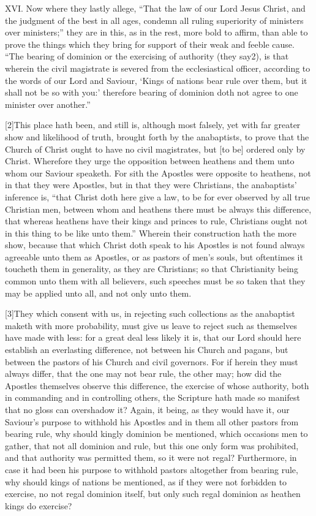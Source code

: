 XVI. Now where they lastly allege, “That the law of our Lord Jesus Christ, and the judgment of the best in all ages, condemn all ruling superiority of ministers over ministers;” they are in this, as in the rest, more bold to affirm, than able to prove the things which they bring for support of their weak and feeble cause. “The bearing of dominion or the exercising of authority (they say2), is that wherein the civil magistrate is severed from the ecclesiastical officer, according to the words of our Lord and Saviour, ‘Kings of nations bear rule over them, but it shall not be so with you:’ therefore bearing of dominion doth not agree to one minister over another.”

[2]This place hath been, and still is, although most falsely, yet with far greater show and likelihood of truth, brought forth by the anabaptists, to prove that the Church of Christ ought to have no civil magistrates, but [to be] ordered only by Christ. Wherefore they urge the opposition between heathens and them unto whom our Saviour speaketh. For sith the Apostles were opposite to heathens, not in that they were Apostles, but in that they were Christians, the  anabaptists’ inference is, “that Christ doth here give a law, to be for ever observed by all true Christian men, between whom and heathens there must be always this difference, that whereas heathens have their kings and princes to rule, Christians ought not in this thing to be like unto them.” Wherein their construction hath the more show, because that which Christ doth speak to his Apostles is not found always agreeable unto them as Apostles, or as pastors of men’s souls, but oftentimes it toucheth them in generality, as they are Christians; so that Christianity being common unto them with all believers, such speeches must be so taken that they may be applied unto all, and not only unto them.

[3]They which consent with us, in rejecting such collections as the anabaptist maketh with more probability, must give us leave to reject such as themselves have made with less: for a great deal less likely it is, that our Lord should here establish an everlasting difference, not between his Church and pagans, but between the pastors of his Church and civil governors. For if herein they must always differ, that the one may not bear rule, the other may; how did the Apostles themselves observe this difference, the exercise of whose authority, both in commanding and in controlling others, the Scripture hath made so manifest that no gloss can overshadow it? Again, it being, as they would have it, our Saviour’s purpose to withhold his Apostles and in them all other pastors from bearing rule, why should kingly dominion be mentioned, which occasions men to gather, that not all dominion and rule, but this one only form was prohibited, and that authority was permitted them, so it were not regal? Furthermore, in case it had been his purpose to withhold pastors altogether from bearing rule, why should kings of nations be mentioned, as if they were not forbidden to exercise, no not regal dominion itself, but only such regal dominion as heathen kings do exercise?

